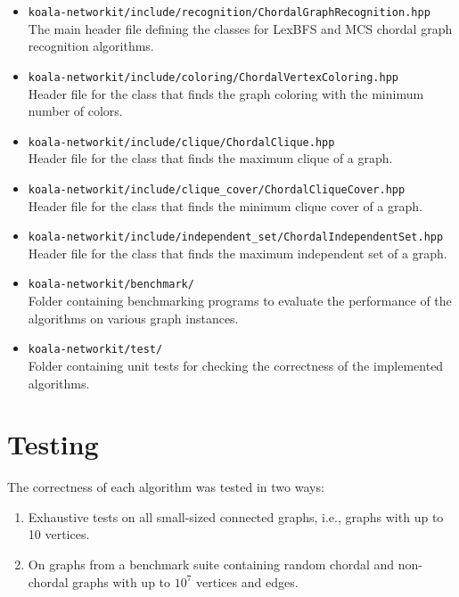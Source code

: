 \begin{itemize}
    \item \texttt{koala-networkit/include/recognition/ChordalGraphRecognition.hpp} \\
    The main header file defining the classes for LexBFS and MCS chordal graph recognition algorithms.
    
    \item \texttt{koala-networkit/include/coloring/ChordalVertexColoring.hpp} \\
    Header file for the class that finds the graph coloring with the minimum number of colors.
    
    \item \texttt{koala-networkit/include/clique/ChordalClique.hpp} \\
    Header file for the class that finds the maximum clique of a graph.
    
    \item \texttt{koala-networkit/include/clique\_cover/ChordalCliqueCover.hpp} \\
    Header file for the class that finds the minimum clique cover of a graph.
    
    \item \texttt{koala-networkit/include/independent\_set/ChordalIndependentSet.hpp} \\
    Header file for the class that finds the maximum independent set of a graph.
    
    \item \texttt{koala-networkit/benchmark/} \\
    Folder containing benchmarking programs to evaluate the performance of the algorithms on various graph instances.
    
    \item \texttt{koala-networkit/test/} \\
    Folder containing unit tests for checking the correctness of the implemented algorithms.
\end{itemize}

\section{Testing}

The correctness of each algorithm was tested in two ways:
\begin{enumerate}
    \item Exhaustive tests on all small-sized connected graphs, i.e., graphs with up to 10 vertices.
    \item On graphs from a benchmark suite containing random chordal and non-chordal graphs with up to $10^7$ vertices and edges.
\end{enumerate}

